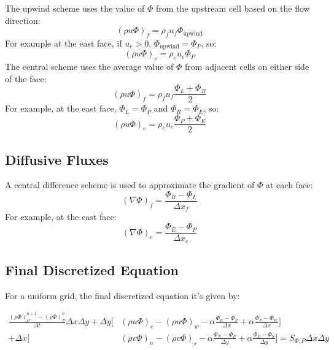\documentclass{article}
\begin{document}
The upwind scheme uses the value of $\Phi$ from the upstream cell based on the flow direction:
\begin{equation}
(\rho u \Phi)_f = \rho_f u_f \Phi_{\text{upwind}}
\end{equation}
For example at the east face, if $u_e > 0$, $\Phi_{\text{upwind}} = \Phi_P$, so:
\begin{equation}
  (\rho u \Phi)_e = \rho_e u_e \Phi_P 
  \end{equation}
The central scheme uses the average value of $\Phi$ from adjacent cells on either side of the face:
\begin{equation}
(\rho u \Phi)_f = \rho_f u_f \frac{\Phi_L + \Phi_R}{2}
\end{equation}
For example, at the east face, $\Phi_L = \Phi_P$ and $\Phi_R = \Phi_E$, so:
\begin{equation}
(\rho u \Phi)_e = \rho_e u_e \frac{\Phi_P + \Phi_E}{2}
\end{equation}

\subsection*{Diffusive Fluxes}

A central difference scheme is used to approximate the gradient of $\Phi$ at each face:
\begin{equation}
(\nabla \Phi)_f = \frac{\Phi_R - \Phi_L}{\Delta x_f}
\end{equation}
For example, at the east face:
\begin{equation}
(\nabla \Phi)_e = \frac{\Phi_E - \Phi_P}{\Delta x_e}
\end{equation}

\subsection{Final Discretized Equation}

For a uniform grid, the final discretized equation it's given by:

\begin{align*}
\frac{(\rho \Phi)_P^{n+1} - (\rho \Phi)_P^n}{\Delta t} \Delta x \Delta y + \Delta y \Bigg[ & (\rho u \Phi)_e - (\rho u \Phi)_w - \alpha \frac{\Phi_E - \Phi_P}{\Delta x} + \alpha \frac{\Phi_P - \Phi_W}{\Delta x} \Bigg] \\
+ \Delta x \Bigg[ & (\rho v \Phi)_n - (\rho v \Phi)_s - \alpha \frac{\Phi_N - \Phi_P}{\Delta y} + \alpha \frac{\Phi_P - \Phi_S}{\Delta y} \Bigg] = S_{\Phi, P} \Delta x \Delta y
\end{align*}
\end{document}
